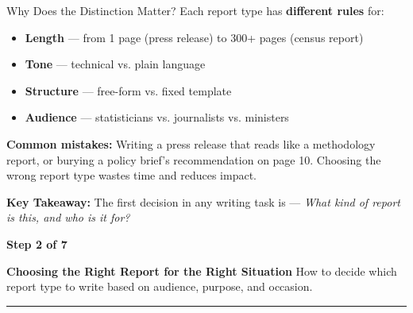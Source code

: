 \documentclass[xcolor={table,dvipsnames},aspectratio=169,11pt]{beamer}
\newcommand{\stepbadge}[1]{%
    \begin{tcolorbox}[colback=nsoGold,colframe=nsoGold,arc=8pt,auto outer arc,
        halign=center,valign=center,width=2.5cm,boxrule=0pt,top=2pt,bottom=2pt,left=2pt,right=2pt]
        \color{white}\tiny\bfseries #1
    \end{tcolorbox}%
}
\begin{document}
\begin{frame}{Why Does the Distinction Matter?}
    Each report type has \textbf{different rules} for:
    \begin{itemize}
        \item \textbf{Length} --- from 1 page (press release) to 300+ pages (census report)
        \item \textbf{Tone} --- technical vs. plain language
        \item \textbf{Structure} --- free-form vs. fixed template
        \item \textbf{Audience} --- statisticians vs. journalists vs. ministers
    \end{itemize}
    \begin{warnbox}
    \scriptsize \textbf{Common mistakes:} Writing a press release that reads like a methodology report, or burying a policy brief's recommendation on page 10. Choosing the wrong report type wastes time and reduces impact.
    \end{warnbox}
    \begin{takeawaybox}
    \scriptsize \textbf{Key Takeaway:} The first decision in any writing task is --- \emph{What kind of report is this, and who is it for?}
    \end{takeawaybox}
\end{frame}

{
\begin{frame}[plain]
    \vspace{1.5cm}
    \stepbadge{Step 2 of 7}
    \vskip 0.4cm
    {\color{white}\LARGE\bfseries Choosing the Right Report for the Right Situation}
    \vskip 0.4cm
    {\color{nsoLight}\large How to decide which report type to write based on audience, purpose, and occasion.}
    \vskip 0.8cm
    \textcolor{nsoGold}{\rule{3cm}{3pt}}
\end{frame}
}
\end{document}
